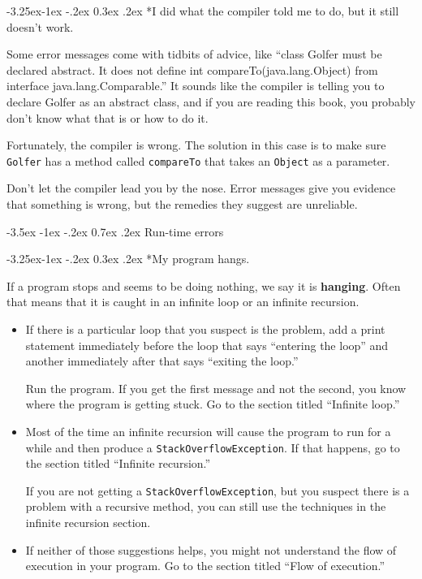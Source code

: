 \documentclass[12pt]{book}
\makeatletter
\theoremstyle{exercise}
\newcommand{\java}[1]{\verb"#1"}
\renewcommand{\section}{\@startsection{section}{1}{\z@}%
    {-3.5ex \@plus -1ex \@minus -.2ex}%
    {0.7ex \@plus.2ex}%
    {\normalfont\Large\bfseries}}
\renewcommand\subsection{\@startsection{subsection}{2}{\z@}%
    {-3.25ex\@plus -1ex \@minus -.2ex}%
    {0.3ex \@plus .2ex}%
    {\normalfont\large\bfseries}}
\newcommand{\java}[1]{\lstinline{#1}} %
\makeatother
\begin{document}
\subsection*{I did what the compiler told me to do, but it
still doesn't work.}

Some error messages come with tidbits of advice, like ``class Golfer must be declared abstract. It does not define int compareTo(java.lang.Object) from
interface java.lang.Comparable.''
It sounds like the compiler is telling you to declare Golfer as an abstract class, and if you are reading this book, you probably don't know what that is
or how to do it.

Fortunately, the compiler is wrong.
The solution in this case is to make sure {\tt Golfer} has a method called {\tt compareTo} that takes an {\tt Object} as a parameter.

Don't let the compiler lead you by the nose.
Error messages give you evidence that something is wrong, but the remedies they suggest are unreliable.


\section{Run-time errors}

\subsection*{My program hangs.}

If a program stops and seems to be doing nothing, we say it is {\bf hanging}.  Often that means that it is caught in an infinite loop or an infinite recursion.

\begin{itemize}

\item If there is a particular loop that you suspect is the problem, add a print statement immediately before the loop that says ``entering the loop'' and another immediately after that says ``exiting the loop.''

Run the program.
If you get the first message and not the second, you know where the program is getting stuck.
Go to the section titled ``Infinite loop.''

\item Most of the time an infinite recursion will cause the program to run for a while and then produce a \java{StackOverflowException}.
If that happens, go to the section titled ``Infinite recursion.''

If you are not getting a \java{StackOverflowException}, but you suspect there is a problem with a recursive method, you can still use the techniques in the infinite recursion section.

\item If neither of those suggestions helps, you might not understand the flow of execution in your program.
Go to the section titled ``Flow of execution.''

\end{itemize}
\end{document}
